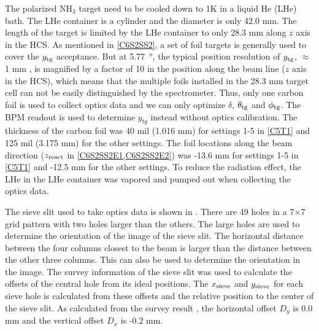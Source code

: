 The polarized NH${}_3$ target need to be cooled down to 1K in a liquid He (LHe) bath. The LHe container is a cylinder and the diameter is only 42.0 mm. The length of the target is limited by the LHe container to only 28.3 mm along $z$ axis in the HCS. As mentioned in \cref{C6S2SS2}, a set of foil targets is generally used to cover the $y_{\mathrm{tg}}$ acceptance. But at \SI{5.77}{\degree}, the typical position resolution of $y_{\mathrm{tg}}$, $\approx$ 1 mm \cite{Alcorn2004}, is magnified by a factor of 10 in the position along the beam line ($z$ axis in the HCS), which means that the multiple foils installed in the 28.3 mm target cell can not be easily distinguished by the spectrometer. Thus, only one carbon foil is used to collect optics data and we can only optimize $\delta$, $\theta_{\mathrm{tg}}$ and $\phi_{\mathrm{tg}}$. The BPM readout is used to determine $y_{tg}$ instead without optics calibration. The thickness of the carbon foil was 40 mil (1.016 mm) for settings 1-5 in \cref{C5T1} and 125 mil (3.175 mm) for the other settings. The foil locations along the beam direction ($z_{\mathrm{react}}$ in \cref{C6S2SS2E1,C6S2SS2E2}) was -13.6 mm for settings 1-5 in \cref{C5T1} and -12.5 mm for the other settings. To reduce the radiation effect, the LHe in the LHe container was vapored and pumped out when collecting the optics data.

The sieve slit used to take optics data is shown in . There are 49 holes in a 7$\times$7 grid pattern with two holes larger than the others. The large holes are used to determine the orientation of the image of the sieve slit. The horizontal distance between the four columns closest to the beam is larger than the distance between the other three columns. This can also be used to determine the orientation in the image. The survey information of the sieve slit was used to calculate the offsets of the central hole from its ideal positions. The $x_{\mathrm{sieve}}$ and $y_{\mathrm{sieve}}$ for each sieve hole is calculated from these offsets and the relative position to the center of the sieve slit. As calculated from the survey result \cite{SurveyA1453,SurveyA1465}, the horizontal offset $D_y$ is 0.0 mm and the vertical offset $D_x$ is -0.2 mm.


